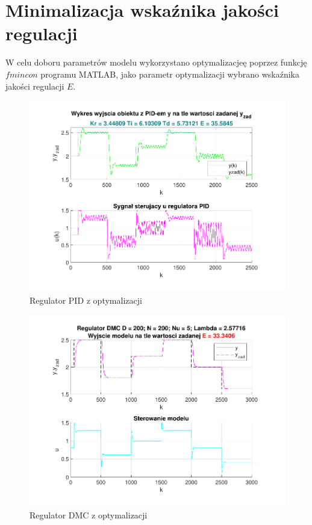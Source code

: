 \section{Minimalizacja wskaźnika jakości regulacji}
W celu doboru parametrów modelu wykorzystano optymalizacjeę poprzez funkcję $fmincon$ programu MATLAB, 
jako parametr optymalizacji wybrano wskaźnika jakości regulacji $E$.

\begin{figure}[H]
    \centering
    \includegraphics[scale=0.90]{../projekt/zad6/PID_opt_pdf/PID_opt.pdf}
    \caption{Regulator PID z optymalizacji}
\end{figure}

\begin{figure}[H]
    \centering
    \includegraphics[scale=0.90]{../projekt/zad6/DMC_opt_pdf/DMC_opt.pdf}
    \caption{Regulator DMC z optymalizacji}
\end{figure}
